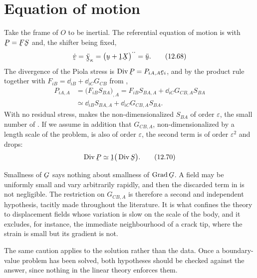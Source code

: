 \section{Equation of motion}\label{sec:ch12eom}

Take the frame of $O$ to be inertial. The referential equation of motion
is  with $\bP=\bF\bS$ and, the shifter being fixed,
\begin{equation}
   \dot\bv=\ddot{\bchi}_{\kappa}
   =\big(\bu+\shift\bX\big)^{\textstyle\cdot\cdot}=\ddot\bu .
   \tag{12.68}\label{eq:12.68}
\end{equation}
The divergence of the Piola stress is $\Dvg\bP=P_{iA,A}\be_{i}$, and by
the product rule together with $F_{iB}=\dd_{iB}+\dd_{iC}G_{CB}$ from
,
\begin{equation}
\begin{aligned}
   P_{iA,A}&=\big(F_{iB}S_{BA}\big)_{,A}
   =F_{iB}S_{BA,A}+\dd_{iC}G_{CB,A}S_{BA}\\
   &\simeq\dd_{iB}S_{BA,A}+\dd_{iC}G_{CB,A}S_{BA}.
\end{aligned}
   \tag{12.69}\label{eq:12.69}
\end{equation}
With no residual stress,  makes the non-dimensionalized
$S_{BA}$ of order $\varepsilon$, the small number of . If we
assume in addition that $G_{CB,A}$, non-dimensionalized by a length
scale of the problem, is also of order $\varepsilon$, the second term is
of order $\varepsilon^{2}$ and drops:
\begin{equation}
   \Dvg\bP\simeq\shift\big(\Dvg\bS\big).
   \tag{12.70}\label{eq:12.70}
\end{equation}

\begin{remark}%
\label{rem:ch12extra}
Smallness of $\bG$ says nothing about smallness of $\Grad\bG$. A field
may be uniformly small and vary arbitrarily rapidly, and then the
discarded term in  is not negligible. The restriction on
$G_{CB,A}$ is therefore a second and independent hypothesis, tacitly
made throughout the literature. It is what confines the theory to
displacement fields whose variation is slow on the scale of the body,
and it excludes, for instance, the immediate neighbourhood of a crack
tip, where the strain is small but its gradient is not.

The same caution applies to the solution rather than the data. Once a
boundary-value problem has been solved, both hypotheses should be
checked against the answer, since nothing in the linear theory enforces
them.
\end{remark}

